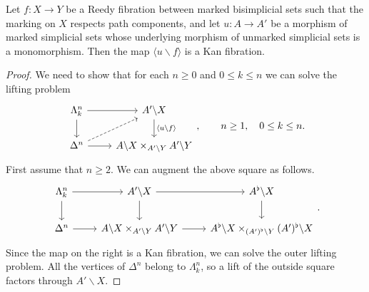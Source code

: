 \documentclass[main.tex]{subfiles}
\begin{document}
\begin{proposition}
  \label{prop:cartesian_marking_respects_path_components}
  Let $f\colon X \to Y$ be a Reedy fibration between marked bisimplicial sets such that the marking on $X$ respects path components, and let $u\colon A \to A'$ be a morphism of marked simplicial sets whose underlying morphism of unmarked simplicial sets is a monomorphism. Then the map $\langle u \backslash f \rangle$ is a Kan fibration.
\end{proposition}
\begin{proof}
  We need to show that for each $n \geq 0$ and $0 \leq k \leq n$ we can solve the lifting problem
  \begin{equation*}
    \begin{tikzcd}
      \Lambda^{n}_{k}
      \arrow[r]
      \arrow[d]
      & A' \backslash X
      \arrow[d, "\langle u \backslash f \rangle"]
      \\
      \Delta^{n}
      \arrow[r]
      \arrow[ur, dashed]
      & A \backslash X \times_{A' \backslash Y} A' \backslash Y
    \end{tikzcd},
    \qquad n \geq 1,\quad 0 \leq k \leq n.
  \end{equation*}
  First assume that $n \geq 2$. We can augment the above square as follows.
  \begin{equation*}
    \begin{tikzcd}
      \Lambda^{n}_{k}
      \arrow[r]
      \arrow[d]
      & A' \backslash X
      \arrow[r]
      \arrow[d]
      & A^{\flat} \backslash X
      \arrow[d]
      \\
      \Delta^{n}
      \arrow[r]
      & A \backslash X \times_{A' \backslash Y} A' \backslash Y
      \arrow[r]
      & A^{\flat} \backslash X \times_{(A')^{\flat} \backslash Y} (A')^{\flat} \backslash X
    \end{tikzcd}.
  \end{equation*}
  Since the map on the right is a Kan fibration, we can solve the outer lifting problem. All the vertices of $\Delta^{n}$ belong to $\Lambda^{n}_{k}$, so a lift of the outside square factors through $A' \backslash X$.


\end{proof}
\end{document}
